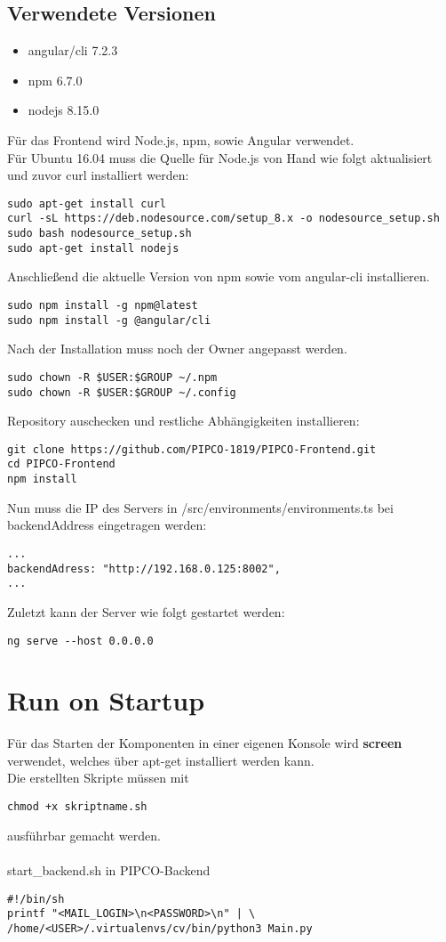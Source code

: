 \subsection{Verwendete Versionen}
\begin{itemize}
	\item angular/cli 7.2.3
	\item npm 6.7.0
	\item nodejs 8.15.0
\end{itemize}
Für das Frontend wird Node.js, npm, sowie Angular verwendet.\\
Für Ubuntu 16.04 muss die Quelle für Node.js von Hand wie folgt aktualisiert und zuvor curl installiert werden:
\begin{lstlisting}[frame=single]
sudo apt-get install curl
curl -sL https://deb.nodesource.com/setup_8.x -o nodesource_setup.sh
sudo bash nodesource_setup.sh
sudo apt-get install nodejs
\end{lstlisting}
Anschließend die aktuelle Version von npm sowie vom angular-cli installieren.
\begin{lstlisting}[frame=single]
sudo npm install -g npm@latest
sudo npm install -g @angular/cli
\end{lstlisting}
Nach der Installation muss noch der Owner angepasst werden.
\begin{lstlisting}[frame=single]
sudo chown -R $USER:$GROUP ~/.npm
sudo chown -R $USER:$GROUP ~/.config
\end{lstlisting}
Repository auschecken und restliche Abhängigkeiten installieren:
\begin{lstlisting}[frame=single]
git clone https://github.com/PIPCO-1819/PIPCO-Frontend.git
cd PIPCO-Frontend
npm install
\end{lstlisting}
Nun muss die IP des Servers in /src/environments/environments.ts bei backendAddress eingetragen werden:\\
\begin{lstlisting}[frame=single]
...
backendAdress: "http://192.168.0.125:8002",
...
\end{lstlisting}
Zuletzt kann der Server wie folgt gestartet werden:
\begin{lstlisting}[frame=single]
ng serve --host 0.0.0.0
\end{lstlisting}

\section{Run on Startup}
Für das Starten der Komponenten in einer eigenen Konsole wird \textbf{screen} verwendet, welches über apt-get installiert werden kann.\\
Die erstellten Skripte müssen mit
\begin{lstlisting}[frame=single]
chmod +x skriptname.sh
\end{lstlisting}
ausführbar gemacht werden.\\\\
start\_backend.sh in PIPCO-Backend
\begin{lstlisting}[frame=single]
#!/bin/sh
printf "<MAIL_LOGIN>\n<PASSWORD>\n" | \
/home/<USER>/.virtualenvs/cv/bin/python3 Main.py
\end{lstlisting}

